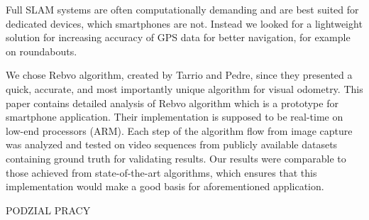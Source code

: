 \cite{pineco}
\cite{androidvr} 

Full SLAM systems are often computationally demanding and are best suited for dedicated devices, which smartphones are not. Instead we looked for a lightweight solution for increasing accuracy of GPS data for better navigation, for example on roundabouts.

We chose Rebvo algorithm, created by Tarrio and Pedre, since they presented a quick, accurate, and most importantly unique algorithm for visual odometry. This paper contains detailed analysis of Rebvo algorithm which is a prototype for smartphone application. Their implementation is supposed to be real-time on low-end processors (ARM).
Each step of the algorithm flow from image capture was analyzed and tested on video sequences from publicly available datasets containing ground truth for validating results. Our results were comparable to those achieved from state-of-the-art algorithms, which ensures that this implementation would make a good basis for aforementioned application.

PODZIAL PRACY
\clearpage 